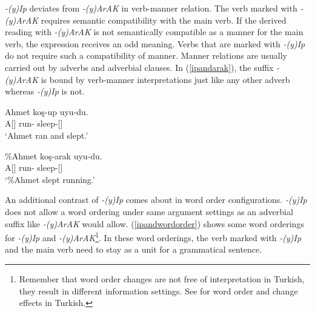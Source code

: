 \textit{-(y)Ip} deviates from \textit{-(y)ArAK} in verb-manner relation. The verb marked with \textit{-(y)ArAK} requires semantic compatibility with the main verb. If the derived reading with \textit{-(y)ArAK} is not semantically compatible as a manner for the main verb, the expression receives an odd meaning. Verbs that are marked with \textit{-(y)Ip} do not require such a compatibility of manner. Manner relations are usually carried out by adverbs and adverbial clauses. In (\ref{ipandarak}), the suffix \textit{-(y)ArAK} is bound by verb-manner interpretations just like any other adverb whereas \textit{-(y)Ip} is not.

\begin{exe}
    \ex \label{ipandarak}
    \begin{xlist}
        \ex \label{ipandarak1} 
        \gll Ahmet koş-up uyu-du. \\
        A[{\Nom}] run-{\Pc} sleep-{\Pst}[{\Tsg}] \\
        \glt `Ahmet ran and slept.'
        
        \ex \label{ipandarak2} 
        \gll \%Ahmet koş-arak uyu-du. \\ 
        A[{\Nom}] run-{\By} sleep-{\Pst}[{\Tsg}] \\
        \glt `\%Ahmet slept running.'
    \end{xlist}
\end{exe}


An additional contrast of \textit{-(y)Ip} comes about in word order configurations. \textit{-(y)Ip} does not allow a word ordering under same argument settings as an adverbial suffix like \textit{-(y)ArAK} would allow. (\ref{ipandwordorder}) shows some word orderings for \textit{-(y)Ip} and \textit{-(y)ArAK}\footnote{Remember that word order changes are not free of interpretation in Turkish, they result in different information settings. See  \citet{ozturk2002turkish} for word order and change effects in Turkish.}. In these word orderings, the verb marked with \textit{-(y)Ip} and the main verb need to stay as a unit for a grammatical sentence.

